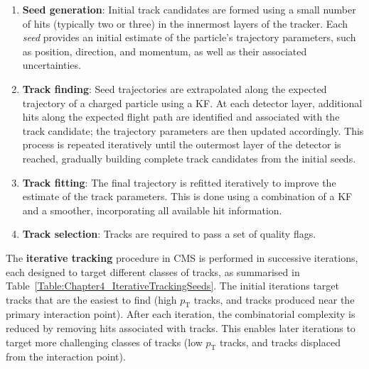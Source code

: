 \begin{enumerate}
    \item \textbf{Seed generation}: Initial track candidates are formed using a small number of hits (typically two or three) in the innermost layers of the tracker. Each \textit{seed} provides an initial estimate of the particle's trajectory parameters, such as position, direction, and momentum, as well as their associated uncertainties. 
    \item \textbf{Track finding}: Seed trajectories are extrapolated along the expected trajectory of a charged particle using a \ac{KF}. At each detector layer, additional hits along the expected flight path are identified and associated with the track candidate; the trajectory parameters are then updated accordingly. This process is repeated iteratively until the outermost layer of the detector is reached, gradually building complete track candidates from the initial seeds.
    \item \textbf{Track fitting}: The final trajectory is refitted iteratively to improve the estimate of the track parameters. This is done using a combination of a \ac{KF} and a smoother, incorporating all available hit information.
    \item \textbf{Track selection}: Tracks are required to pass a set of quality flags.
\end{enumerate}

The \textbf{iterative tracking} procedure in \ac{CMS} is performed in successive iterations, each designed to target different classes of tracks, as summarised in Table~\ref{Table:Chapter4_IterativeTrackingSeeds}. The initial iterations target tracks that are the easiest to find (\eg high $p_\mathrm{T}$ tracks, and tracks produced near the primary interaction point). After each iteration, the combinatorial complexity is reduced by removing hits associated with tracks. This enables later iterations to target more challenging classes of tracks (\eg low $p_\mathrm{T}$ tracks, and tracks displaced from the interaction point). 

